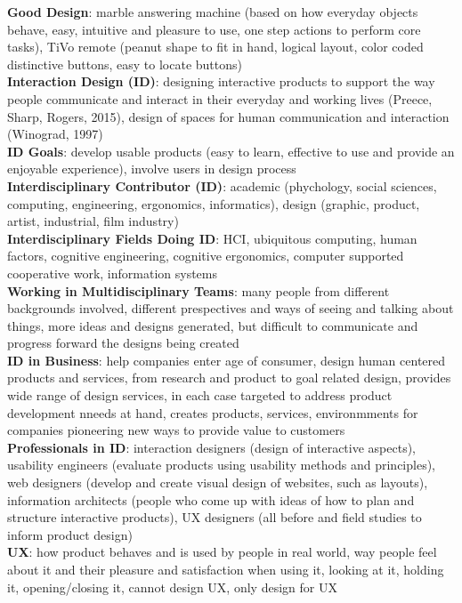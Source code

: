 \documentclass[a4paper]{article}
\begin{document}
\begin{multicols}{2}
        \textbf{Good Design}: marble answering machine (based on how everyday objects behave, easy, intuitive and pleasure to use, one step actions to perform core tasks), TiVo remote (peanut shape to fit in hand, logical layout, color coded distinctive buttons, easy to locate buttons)\\
        \textbf{Interaction Design (ID)}: designing interactive products to support the way people communicate and interact in their everyday and working lives (Preece, Sharp, Rogers, 2015), design of spaces for human communication and interaction (Winograd, 1997)\\
        \textbf{ID Goals}: develop usable products (easy to learn, effective to use and provide an enjoyable experience), involve users in design process\\
        \textbf{Interdisciplinary Contributor (ID)}: academic (phychology, social sciences, computing, engineering, ergonomics, informatics), design (graphic, product, artist, industrial, film industry)\\
        \textbf{Interdisciplinary Fields Doing ID}: HCI, ubiquitous computing, human factors, cognitive engineering, cognitive ergonomics, computer supported cooperative work, information systems\\
        \textbf{Working in Multidisciplinary Teams}: many people from different backgrounds involved, different prespectives and ways of seeing and talking about things, more ideas and designs generated, but difficult to communicate and progress forward the designs being created\\
        \textbf{ID in Business}: help companies enter age of consumer, design human centered products and services, from research and product to goal related design, provides wide range of design services, in each case targeted to address product development nneeds at hand, creates products, services, environmments for companies pioneering new ways to provide value to customers\\
        \textbf{Professionals in ID}: interaction designers (design of interactive aspects), usability engineers (evaluate products using usability methods and principles), web designers (develop and create visual design of websites, such as layouts), information architects (people who come up with ideas of how to plan and structure interactive products), UX designers (all before and field studies to inform product design)\\
        \textbf{UX}: how product behaves and is used by people in real world, way people feel about it and their pleasure and satisfaction when using it, looking at it, holding it, opening/closing it, cannot design UX, only design for UX\\

\end{multicols}
\end{document}
